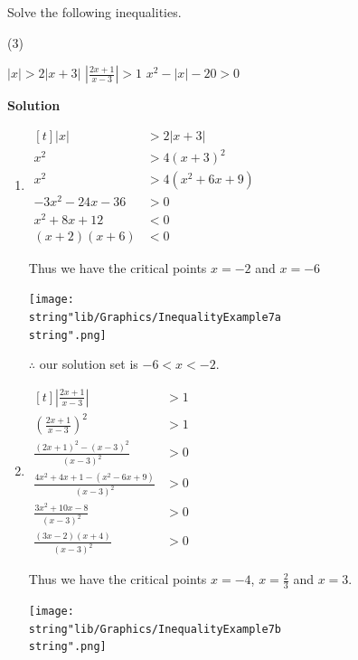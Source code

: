 \documentclass[11pt,a4paper]{book}
\begin{document}
\begin{example}

Solve the following inequalities.
\begin{tasks}[label=(\alph*),label-width=3.5ex](3)

\task $\left|x\right|>2\left|x+3\right|$
\task ${\displaystyle \left|\frac{2x+1}{x-3}\right|>1}$
\task $x^{2}-\left|x\right|-20>0$

\end{tasks}

\textbf{Solution}
\begin{enumerate}[label=(\alph*)]

\item
$
\begin{aligned}[t]
\left|x\right| & >2\left|x+3\right|\\
x^{2} & >4\left(x+3\right)^{2}\\
x^{2} & >4\left(x^{2}+6x+9\right)\\
-3x^{2}-24x-36 & >0\\
x^{2}+8x+12 & <0\\
\left(x+2\right)\left(x+6\right) & <0
\end{aligned}
$

Thus we have the critical points $x=-2$ and $x=-6$
\begin{center}
\texttt{[image: \\string"lib/Graphics/InequalityExample7a\\string".png]}
\par\end{center}
$\therefore$ our solution set is $-6<x<-2$.

\item
$
\begin{aligned}[t]
{\displaystyle \left|\frac{2x+1}{x-3}\right|} & >1\\
{\displaystyle \left(\frac{2x+1}{x-3}\right)^{2}} & >1\\
\frac{\left(2x+1\right)^{2}-\left(x-3\right)^{2}}{\left(x-3\right)^{2}} & >0\\
\frac{4x^{2}+4x+1-\left(x^{2}-6x+9\right)}{\left(x-3\right)^{2}} & >0\\
\frac{3x^{2}+10x-8}{\left(x-3\right)^{2}} & >0\\
\frac{\left(3x-2\right)\left(x+4\right)}{\left(x-3\right)^{2}} & >0
\end{aligned}
$

Thus we have the critical points $x=-4$, ${\displaystyle x=\frac{2}{3}}$
and $x=3$.
\begin{center}
\texttt{[image: \\string"lib/Graphics/InequalityExample7b\\string".png]}
\par\end{center}


\end{enumerate}
\end{example}
\end{document}
